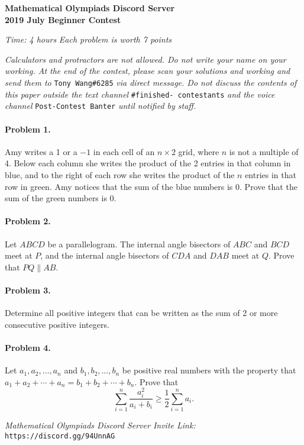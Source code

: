 \documentclass[11pt]{article}
\begin{document}
		\noindent \Large\textbf{Mathematical Olympiads Discord Server}
		\vspace{5pt}\\
		\noindent \huge\textbf{2019 July Beginner Contest}\\
		\noindent \makebox[\linewidth]{\rule{\textwidth}{0.4pt}}
			
	\normalsize
	
	\begin{flushright}
	\textit{Time: 4 hours} \hfill \textit{Each problem is worth 7 points}
	\end{flushright}
	
	\noindent \textit{Calculators and protractors are not allowed. Do not write your name on your working. At the end of the contest, please scan your solutions and working and send them to }\texttt{Tony Wang\#6285}\textit{ via direct message. Do not discuss the contents of this paper outside the text channel }\texttt{\#finished- contestants}\textit{ and the voice channel }\texttt{Post-Contest Banter}\textit{ until notified by staff.}
	
	\paragraph{Problem 1.} Amy writes a 1 or a \(-1\) in each cell of an \(n \times 2\) grid, where \(n\) is not a multiple of 4. Below each column she writes the product of the 2 entries in that column in blue, and to the right of each row she writes the product of the \(n\) entries in that row in green. Amy notices that the sum of the blue numbers is 0. Prove that the sum of the green numbers is 0.

	\paragraph{Problem 2.} Let \(ABCD\) be a parallelogram. The internal angle bisectors of \(ABC\) and \(BCD\) meet at \(P\), and the internal angle bisectors of \(CDA\) and \(DAB\) meet at \(Q\). Prove that \(PQ \parallel AB\).

	\paragraph{Problem 3.} Determine all positive integers that can be written as the sum of 2 or more consecutive positive integers.

	\paragraph{Problem 4.} Let \(a_1, a_2, \dots, a_n\) and \(b_1, b_2, \dots, b_n\) be positive real numbers with the property that \(a_1+a_2+ \cdots + a_n = b_1+b_2+ \cdots + b_n\). Prove that \[\sum_{i=1}^n \frac{a_i^2}{a_i+b_i} \geq \frac 12 \sum_{i=1}^n a_i.\]
	
	\vfill
	
	\noindent \makebox[\linewidth]{\rule{\textwidth}{0.4pt}}	
	
	\noindent \textit{Mathematical Olympiads Discord Server Invite Link:} \texttt{https://discord.gg/94UnnAG}
		
		
		
		
	
	
\end{document}
